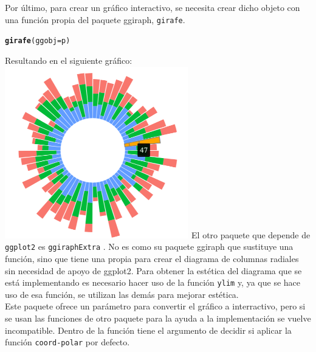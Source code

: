\documentclass{article}\usepackage[]{graphicx}\usepackage[]{color}
\makeatletter
\newcommand{\hlstd}[1]{\textcolor[rgb]{0.345,0.345,0.345}{#1}}%
\newcommand{\hlkwc}[1]{\textcolor[rgb]{0.333,0.667,0.333}{#1}}%
\newcommand{\hlkwd}[1]{\textcolor[rgb]{0.737,0.353,0.396}{\textbf{#1}}}%
\newenvironment{kframe}{%
 \def\at@end@of@kframe{}%
 \ifinner\ifhmode%
  \def\at@end@of@kframe{\end{minipage}}%
  \begin{minipage}{\columnwidth}%
 \fi\fi%
 \def\FrameCommand##1{\hskip\@totalleftmargin \hskip-\fboxsep
 \colorbox{shadecolor}{##1}\hskip-\fboxsep
     \hskip-\linewidth \hskip-\@totalleftmargin \hskip\columnwidth}%
 \MakeFramed {\advance\hsize-\width
   \@totalleftmargin\z@ \linewidth\hsize
   \@setminipage}}%
 {\par\unskip\endMakeFramed%
 \at@end@of@kframe}
\newenvironment{knitrout}{}{} %
\makeatother
\begin{document}
Por \'ultimo, para crear un gr\'afico interactivo, se necesita crear dicho objeto con una funci\'on propia del paquete ggiraph, \texttt{girafe}.
\begin{knitrout}
\color{fgcolor}\begin{kframe}
\begin{alltt}
\hlkwd{girafe}\hlstd{(}\hlkwc{ggobj} \hlstd{= p)}
\end{alltt}
\end{kframe}
\end{knitrout}
Resultando en el siguiente gr\'afico:~\\
\vbox{
    \centering
    \includegraphics[width=0.6\textwidth]{imag/ggiraph_inte}
}
\clearpage
El otro paquete que depende de \texttt{ggplot2} es \texttt{ggiraphExtra} \cite{docu_ggiraphExtra}
. No es como su paquete ggiraph que sustituye una funci\'on, sino que tiene una propia para crear el diagrama de columnas radiales sin necesidad de apoyo de ggplot2. Para obtener la est\'etica del diagrama que se est\'a implementando es necesario hacer uso de la funci\'on \texttt{ylim} y, ya que se hace uso de esa funci\'on, se utilizan las dem\'as para mejorar est\'etica.~\\
Este paquete ofrece un par\'ametro para convertir el gr\'afico a interractivo, pero si se usan las funciones de otro paquete para la ayuda a la implementaci\'on se vuelve incompatible.
Dentro de la funci\'on tiene el argumento de decidir si aplicar la funci\'on \texttt{coord-polar} por defecto.
\end{document}
